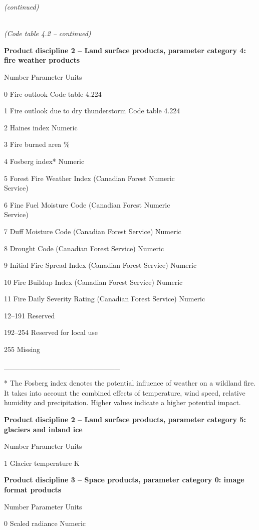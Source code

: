 \emph{(continued)}

\emph{\\
(Code table 4.2 -- continued)}

\textbf{Product discipline 2 -- Land surface products, parameter category 4: fire weather products}

Number Parameter Units

0 Fire outlook Code table 4.224

1 Fire outlook due to dry thunderstorm Code table 4.224

2 Haines index Numeric

3 Fire burned area \%

4 Fosberg index* Numeric

5 Forest Fire Weather Index (Canadian Forest Numeric\\
Service)

6 Fine Fuel Moisture Code (Canadian Forest Numeric\\
Service)

7 Duff Moisture Code (Canadian Forest Service) Numeric

8 Drought Code (Canadian Forest Service) Numeric

9 Initial Fire Spread Index (Canadian Forest Service) Numeric

10 Fire Buildup Index (Canadian Forest Service) Numeric

11 Fire Daily Severity Rating (Canadian Forest Service) Numeric

12--191 Reserved

192--254 Reserved for local use

255 Missing

\_\_\_\_\_\_\_\_\_\_\_\_\_\_\_\_\_\_\_\_\_\_

* The Fosberg index denotes the potential influence of weather on a wildland fire. It takes into account the combined effects of temperature, wind speed, relative humidity and precipitation. Higher values indicate a higher potential impact.

\textbf{Product discipline 2 -- Land surface products, parameter category 5: glaciers and inland ice}

Number Parameter Units

1 Glacier temperature K

\textbf{Product discipline 3 -- Space products, parameter category 0: image format products}

Number Parameter Units

0 Scaled radiance Numeric

